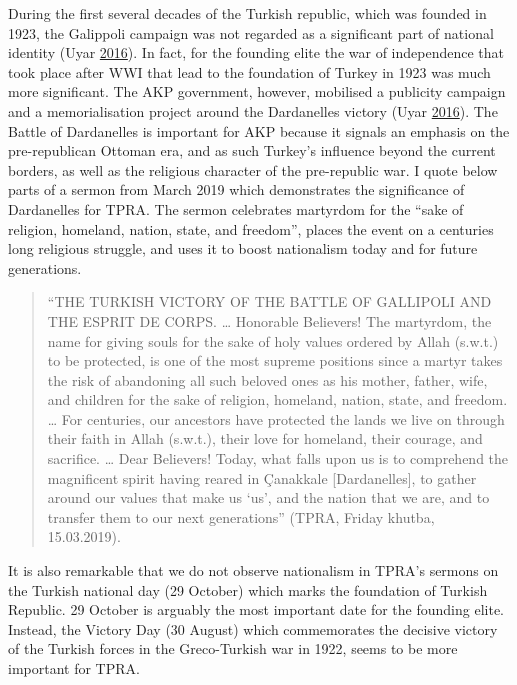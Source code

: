\documentclass[
  12pt,
]{article}
\begin{document}
During the first several decades of the Turkish republic, which was founded in 1923, the Galippoli campaign was not regarded as a significant part of national identity (Uyar \protect\hyperlink{ref-uyar2016remembering}{2016}). In fact, for the founding elite the war of independence that took place after WWI that lead to the foundation of Turkey in 1923 was much more significant. The AKP government, however, mobilised a publicity campaign and a memorialisation project around the Dardanelles victory (Uyar \protect\hyperlink{ref-uyar2016remembering}{2016}). The Battle of Dardanelles is important for AKP because it signals an emphasis on the pre-republican Ottoman era, and as such Turkey's influence beyond the current borders, as well as the religious character of the pre-republic war. I quote below parts of a sermon from March 2019 which demonstrates the significance of Dardanelles for TPRA. The sermon celebrates martyrdom for the ``sake of religion, homeland, nation, state, and freedom'', places the event on a centuries long religious struggle, and uses it to boost nationalism today and for future generations.

\begin{quote}
``THE TURKISH VICTORY OF THE BATTLE OF GALLIPOLI AND THE ESPRIT DE CORPS. \ldots{} Honorable Believers! The martyrdom, the name for giving souls for the sake of holy values ordered by Allah (s.w.t.) to be protected, is one of the most supreme positions since a martyr takes the risk of abandoning all such beloved ones as his mother, father, wife, and children for the sake of religion, homeland, nation, state, and freedom. \ldots{} For centuries, our ancestors have protected the lands we live on through their faith in Allah (s.w.t.), their love for homeland, their courage, and sacrifice. \ldots{} Dear Believers!
Today, what falls upon us is to comprehend the magnificent spirit having reared in Çanakkale {[}Dardanelles{]}, to gather around our values that make us `us', and the nation that we are, and to transfer them to our next generations'' (TPRA, Friday khutba, 15.03.2019).
\end{quote}

It is also remarkable that we do not observe nationalism in TPRA's sermons on the Turkish national day (29 October) which marks the foundation of Turkish Republic. 29 October is arguably the most important date for the founding elite. Instead, the Victory Day (30 August) which commemorates the decisive victory of the Turkish forces in the Greco-Turkish war in 1922, seems to be more important for TPRA.
\end{document}
